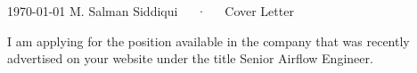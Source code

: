 \documentclass[11pt, a4paper]{awesome-cv}
\begin{document}
	
	\makecvheader
	
	\makecvfooter
	{\today}
	{M. Salman Siddiqui~~~·~~~Cover Letter}
	{}
	
	\makelettertitle
	
	\begin{cvletter}
		
		
		I am applying for the position available in the company that was recently advertised on your website under the title Senior Airflow Engineer.
		

\end{cvletter}
\end{document}
